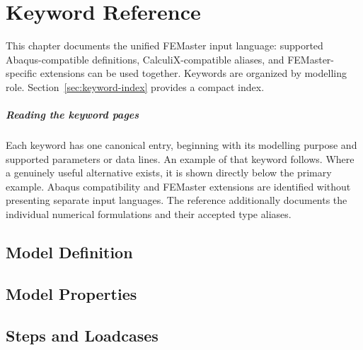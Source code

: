 \chapter{Keyword Reference}
\label{chap:keyword-reference}

This chapter documents the unified FEMaster input language:
supported Abaqus-compatible definitions, CalculiX-compatible aliases,
and FEMaster-specific extensions can be used together. Keywords are
organized by modelling role. Section~\ref{sec:keyword-index}
provides a compact index.

\paragraph*{Reading the keyword pages}

Each keyword has one canonical entry, beginning with its modelling
purpose and supported parameters or data lines. An example of that
keyword follows. Where a genuinely useful alternative exists, it is
shown directly below the primary example. Abaqus compatibility and
FEMaster extensions are identified without presenting separate input
languages. The  reference additionally documents the
individual numerical formulations and their accepted type aliases.



\section{Model Definition}
\label{sec:model-definition}



\section{Model Properties}
\label{sec:model-properties}









\section{Steps and Loadcases}
\label{sec:steps-loadcases}






